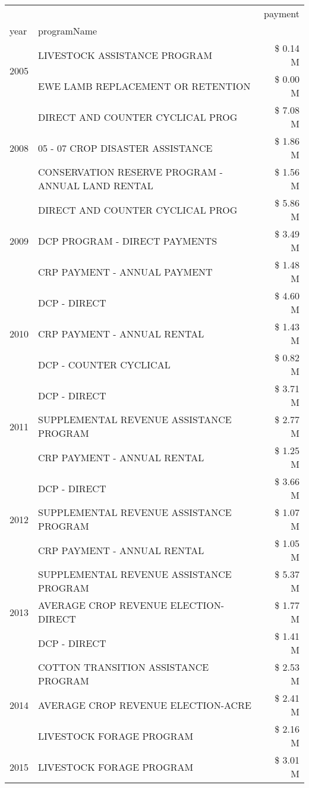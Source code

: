 \begin{tabular}{llr}
\toprule
 &  & payment \\
year & programName &  \\
\midrule
\multirow[t]{2}{*}{2005} & LIVESTOCK ASSISTANCE PROGRAM & \$ 0.14 M \\
 & EWE LAMB REPLACEMENT OR RETENTION & \$ 0.00 M \\
\cline{1-3}
\multirow[t]{3}{*}{2008} & DIRECT AND COUNTER CYCLICAL PROG & \$ 7.08 M \\
 & 05 - 07 CROP DISASTER ASSISTANCE & \$ 1.86 M \\
 & CONSERVATION RESERVE PROGRAM - ANNUAL LAND RENTAL & \$ 1.56 M \\
\cline{1-3}
\multirow[t]{3}{*}{2009} & DIRECT AND COUNTER CYCLICAL PROG & \$ 5.86 M \\
 & DCP PROGRAM - DIRECT PAYMENTS & \$ 3.49 M \\
 & CRP PAYMENT - ANNUAL PAYMENT & \$ 1.48 M \\
\cline{1-3}
\multirow[t]{3}{*}{2010} & DCP - DIRECT & \$ 4.60 M \\
 & CRP PAYMENT - ANNUAL RENTAL & \$ 1.43 M \\
 & DCP - COUNTER CYCLICAL & \$ 0.82 M \\
\cline{1-3}
\multirow[t]{3}{*}{2011} & DCP - DIRECT & \$ 3.71 M \\
 & SUPPLEMENTAL REVENUE ASSISTANCE PROGRAM & \$ 2.77 M \\
 & CRP PAYMENT - ANNUAL RENTAL & \$ 1.25 M \\
\cline{1-3}
\multirow[t]{3}{*}{2012} & DCP - DIRECT & \$ 3.66 M \\
 & SUPPLEMENTAL REVENUE ASSISTANCE PROGRAM & \$ 1.07 M \\
 & CRP PAYMENT - ANNUAL RENTAL & \$ 1.05 M \\
\cline{1-3}
\multirow[t]{3}{*}{2013} & SUPPLEMENTAL REVENUE ASSISTANCE PROGRAM & \$ 5.37 M \\
 & AVERAGE CROP REVENUE ELECTION-DIRECT & \$ 1.77 M \\
 & DCP - DIRECT & \$ 1.41 M \\
\cline{1-3}
\multirow[t]{3}{*}{2014} & COTTON TRANSITION ASSISTANCE PROGRAM & \$ 2.53 M \\
 & AVERAGE CROP REVENUE ELECTION-ACRE & \$ 2.41 M \\
 & LIVESTOCK FORAGE PROGRAM & \$ 2.16 M \\
\cline{1-3}
\multirow[t]{3}{*}{2015} & LIVESTOCK FORAGE PROGRAM & \$ 3.01 M \\

\end{tabular}
